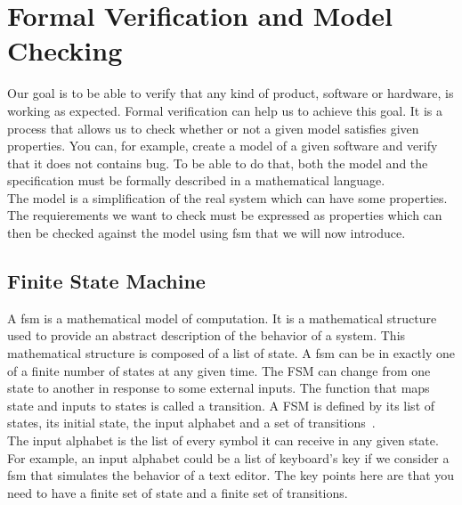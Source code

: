 \documentclass[12pt]{article}
\theoremstyle{definition}
\theoremstyle{definition}
\begin{document}
\clearpage
\section{Formal Verification and Model Checking}

Our goal is to be able to verify that any kind of product, software or hardware, is working as expected. Formal verification can help us to achieve this goal. It is a process that allows us to check whether or not a given model satisfies given properties. You can, for example, create a model of a given software and verify that it does not contains bug. To be able to do that, both the model and the specification must be formally described in a mathematical language.\\

The model is a simplification of the real system which can have some properties. The requierements we want to check must be expressed as properties which can then be checked against the model using \gls{fsm} that we will now introduce.\\



\subsection{Finite State Machine}

A \gls{fsm} is a mathematical model of computation. It is a mathematical structure used to provide an abstract description of the behavior of a system. This mathematical structure is composed of a list of state. A \gls{fsm} can be in exactly one of a finite number of states at any given time. The FSM can change from one state to another in response to some external inputs. The function that maps state and inputs to states is called a transition. A FSM is defined by its list of states, its initial state, the input alphabet and a set of transitions~\cite{FSM:2017}.\\

The input alphabet is the list of every symbol it can receive in any given state. For example, an input alphabet could be a list of keyboard's key if we consider a \gls{fsm} that simulates the behavior of a text editor. The key points here are that you need to have a finite set of state and a finite set of transitions.\\
\end{document}

